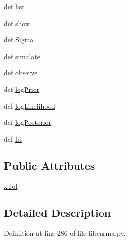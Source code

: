 \begin{DoxyCompactItemize}
\item 
def \hyperlink{classpython_1_1libcarma_1_1libcarma_1_1task_a036a7f2657ec716f9302f9cc5d15449d}{list}
\item 
def \hyperlink{classpython_1_1libcarma_1_1libcarma_1_1task_a9b3a40d7904e96ba27cf91e286cfa599}{show}
\item 
def \hyperlink{classpython_1_1libcarma_1_1libcarma_1_1task_a055e8ca28b2115ec7a8434a68a4f812b}{Sigma}
\item 
def \hyperlink{classpython_1_1libcarma_1_1libcarma_1_1task_ac6b18e34b346ea7ad41c030de9c53f69}{simulate}
\item 
def \hyperlink{classpython_1_1libcarma_1_1libcarma_1_1task_a3e8b381e5920139ac7ae60406792f4f2}{observe}
\item 
def \hyperlink{classpython_1_1libcarma_1_1libcarma_1_1task_a8f9c2672ecb99eba7937d0cab3878c76}{log\-Prior}
\item 
def \hyperlink{classpython_1_1libcarma_1_1libcarma_1_1task_aee49abd18b0a2beea70eba28352edd8d}{log\-Likelihood}
\item 
def \hyperlink{classpython_1_1libcarma_1_1libcarma_1_1task_a4f0a4fa5a145400b19ac43b981e005b7}{log\-Posterior}
\item 
def \hyperlink{classpython_1_1libcarma_1_1libcarma_1_1task_a41483bb32afa386c3b39fd99b5e158e5}{fit}
\end{DoxyCompactItemize}
\subsection*{Public Attributes}
\begin{DoxyCompactItemize}
\item 
\hyperlink{classpython_1_1libcarma_1_1libcarma_1_1task_a6d4e69f1f43143928d306660a0ad78c1}{x\-Tol}
\end{DoxyCompactItemize}


\subsection{Detailed Description}


Definition at line 286 of file libcarma.\-py.



